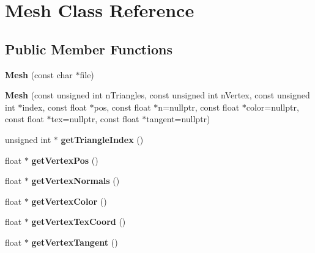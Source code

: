 \hypertarget{class_mesh}{}\section{Mesh Class Reference}
\label{class_mesh}
\subsection*{Public Member Functions}
\begin{DoxyCompactItemize}
\item 
\mbox{\label{class_mesh_af00a97ca15339b6d131be3ce502bebe9}} 
{\bfseries Mesh} (const char $\ast$file)
\item 
\mbox{\label{class_mesh_a52065a07657fadff457f4009b3e694d0}} 
{\bfseries Mesh} (const unsigned int n\+Triangles, const unsigned int n\+Vertex, const unsigned int $\ast$index, const float $\ast$pos, const float $\ast$n=nullptr, const float $\ast$color=nullptr, const float $\ast$tex=nullptr, const float $\ast$tangent=nullptr)
\item 
\mbox{\label{class_mesh_a99962ed2f4a6a0999127f5e4defef6dc}} 
unsigned int $\ast$ {\bfseries get\+Triangle\+Index} ()
\item 
\mbox{\label{class_mesh_a2345e6c20aa6a0f05521b8aeb62203f4}} 
float $\ast$ {\bfseries get\+Vertex\+Pos} ()
\item 
\mbox{\label{class_mesh_ab16f1115ed7865c9e7322c85e2d785af}} 
float $\ast$ {\bfseries get\+Vertex\+Normals} ()
\item 
\mbox{\label{class_mesh_ade2dd22f7cbe37df8e51ba65c800bbc8}} 
float $\ast$ {\bfseries get\+Vertex\+Color} ()
\item 
\mbox{\label{class_mesh_ab6ba57a10fbed17d8f9dc8ec09b92657}} 
float $\ast$ {\bfseries get\+Vertex\+Tex\+Coord} ()
\item 
\mbox{\label{class_mesh_ae5cd8d05ef13c4e71bea276a9783adaf}} 
float $\ast$ {\bfseries get\+Vertex\+Tangent} ()
\item 
\mbox{\label{class_mesh_a838bd5498ec781707bb28830ff5e064d}} 

\end{DoxyCompactItemize}
